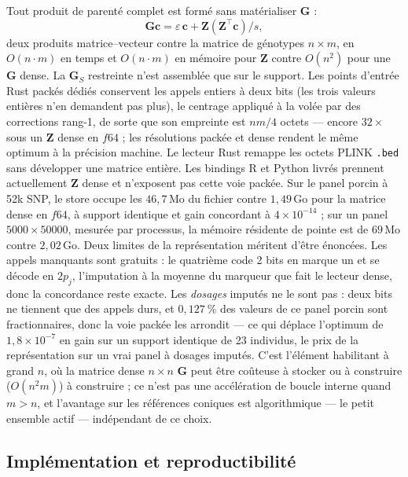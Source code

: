 \documentclass[11pt]{article}
\newcommand{\tp}{^{\top}}
\newcommand{\bc}{\mathbf{c}}
\newcommand{\bG}{\mathbf{G}}
\newcommand{\bZ}{\mathbf{Z}}
\begin{document}
Tout produit de parenté complet est formé sans matérialiser $\bG$ :
\[
  \bG\bc = \varepsilon\,\bc + \bZ(\bZ\tp\bc)/s,
\]
deux produits matrice--vecteur contre la matrice de génotypes $n\times m$, en $O(n\cdot m)$ en temps et $O(n\cdot m)$ en mémoire pour $\bZ$ contre $O(n^2)$ pour une $\bG$ dense. La $\bG_S$ restreinte n'est assemblée que sur le support. Les points d'entrée Rust packés dédiés conservent les appels entiers à deux bits (les trois valeurs entières n'en demandent pas plus), le centrage appliqué à la volée par des corrections rang-1, de sorte que son empreinte est $nm/4$ octets --- encore $32\times$ sous un $\bZ$ dense en $f64$ ; les résolutions packée et dense rendent le même optimum à la précision machine. Le lecteur Rust remappe les octets PLINK \texttt{.bed} sans développer une matrice entière. Les bindings R et Python livrés prennent actuellement $\bZ$ dense et n'exposent pas cette voie packée. Sur le panel porcin à 52k SNP, le store occupe les $46{,}7$\,Mo du fichier contre $1{,}49$\,Go pour la matrice dense en $f64$, à support identique et gain concordant à $4\times10^{-14}$ ; sur un panel $5000\times50000$, mesurée par processus, la mémoire résidente de pointe est de $69$\,Mo contre $2{,}02$\,Go. Deux limites de la représentation méritent d'être énoncées. Les appels manquants sont gratuits : le quatrième code 2 bits en marque un et se décode en $2p_j$, l'imputation à la moyenne du marqueur que fait le lecteur dense, donc la concordance reste exacte. Les \emph{dosages} imputés ne le sont pas : deux bits ne tiennent que des appels durs, et $0{,}127~\%$ des valeurs de ce panel porcin sont fractionnaires, donc la voie packée les arrondit --- ce qui déplace l'optimum de $1{,}8\times10^{-7}$ en gain sur un support identique de 23 individus, le prix de la représentation sur un vrai panel à dosages imputés. C'est l'élément habilitant à grand $n$, où la matrice dense $n\times n$ $\bG$ peut être coûteuse à stocker ou à construire ($O(n^2 m)$) à construire ; ce n'est pas une accélération de boucle interne quand $m>n$, et l'avantage sur les références coniques est algorithmique --- le petit ensemble actif --- indépendant de ce choix.

\subsection{Implémentation et reproductibilité}
\end{document}
